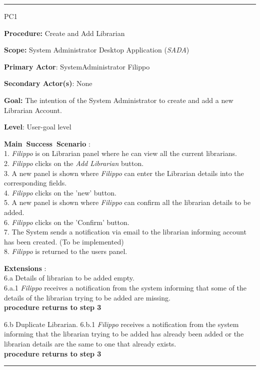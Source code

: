\vspace{0.5cm}
\hrule
\begin{lyxlist}{PC1}
\small{
\item [\textbf{Procedure:}] Create and Add Librarian
\item [\textbf{Scope:}] System Administrator Desktop Application (\emph{SADA})
\item [\textbf{Primary Actor}:] SystemAdministrator Filippo
\item [\textbf{Secondary Actor(s)}:] None
\item [\textbf{Goal:}] The intention of the System Administrator to create and
add a new Librarian Account.
\item [\textbf{Level}:] User-goal level
\item [\textbf{Main~Success~Scenario}]:\\
1. \emph{Filippo} is on Librarian panel where he can view all the current
librarians.
\\
2. \emph{Filippo} clicks on the \emph{Add Librarian} button. \\
3. A new panel is shown where \emph{Filippo} can enter the Librarian details
into the corresponding fields.
\\
4. \emph{Filippo} clicks on the 'new' button. \\
5. A new panel is shown where \emph{Filippo} can confirm all the librarian
details to be added.\\
6. \emph{Filippo} clicks on the 'Confirm' button. \\
7. The System sends a notification via email to the librarian
informing account has been created. (To be implemented)
\\
8. \emph{Filippo} is returned to the users panel. \\



\item [\textbf{Extensions}]: \\
6.a Details of librarian to be added empty.\\
\hspace*{0.5cm} 6.a.1 \emph{Filippo} receives a notification from
the system informing that some of the details of the librarian trying to be
added are missing. \\
\hspace*{0.5cm} \textbf{procedure returns to step 3}

6.b Duplicate Librarian.
\hspace*{0.5cm} 6.b.1 \emph{Filippo} receives a notification from
the system informing that the librarian trying to be added has already been
added or the librarian details are the same to one that already exists.\\
\hspace*{0.5cm} \textbf{procedure returns to step 3}}

\end{lyxlist}
\hrule


